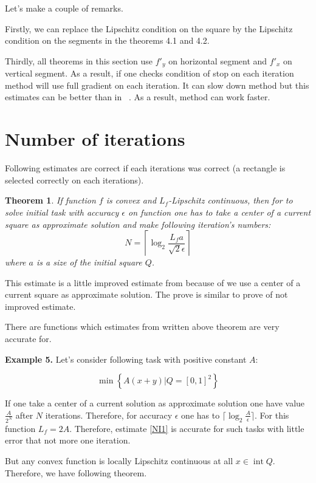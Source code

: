 \documentclass[12pt]{article}
\newtheorem{theorem}{Theorem}[section]
\DeclareMathOperator{\intt}{int}
\begin{document}
Let's make a couple of remarks.

Firstly, we can replace the Lipschitz condition on the square by the Lipschitz condition on the segments in the theorems 4.1 and 4.2.

Thirdly, all theorems in this section use $f'_y$ on horizontal segment and $f'_x$ on vertical segment. As a result, if one checks condition of stop on each iteration method will use full gradient on each iteration. It can slow down method but this estimates can be better than in ~\cite{Ston_Pas}. As a result, method can work faster.

\section{Number of iterations}

Following estimates are correct if each iterations was correct (a rectangle is selected correctly on each iterations).

\begin{theorem}
If function $f$ is convex and $L_f$-Lipschitz continuous, then for to solve initial task with accuracy $\epsilon$ on function one has to take a center of a current square as approximate  solution and make following iteration's numbers:
\begin{equation}\label{NI1}N = \left\lceil\log_2\frac{L_fa}{\sqrt{2}\epsilon}\right\rceil\end{equation}
where $a$ is a size of the initial square $Q$.
\end{theorem}
This estimate is a little improved estimate from \cite{Ston_Pas} because of we use a center of a current square as approximate  solution. The prove is similar to prove of not improved estimate.

There are functions which estimates from written above theorem are very accurate for.

\textbf{Example 5.} Let's consider following task with positive constant $A$:

$$\min\left\{A(x+y)|Q = [0,1]^2\right\}$$

If one take a center of a current solution as approximate  solution one have value $\frac{A}{2^N}$ after $N$ iterations. Therefore, for accuracy $\epsilon$ one has to $\lceil\log_2\frac{A}{\epsilon}\rceil$. For this function $L_f = 2A$. Therefore, estimate \eqref{NI1} is accurate for such tasks with little error that not more one iteration.

But any convex function is locally Lipschitz continuous at all $x \in \intt Q$. Therefore, we have following theorem.
\end{document}
